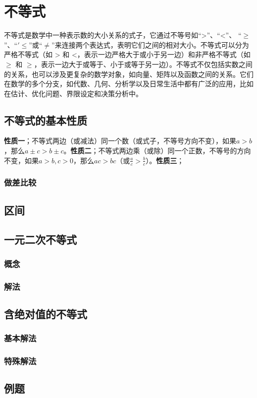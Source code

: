 \section{\textbf{不等式}}

不等式是数学中一种表示数的大小关系的式子，它通过不等号如“>”、“<”、\newline
“$\ge$”、“$'\le$”或“$\ne$”来连接两个表达式，表明它们之间的相对大小。不等式可以分为严格不等式（如 > 和 <，表示一边严格大于或小于另一边）和非严格不等式（如$\ge$ 和 $\ge$，表示一边大于或等于、小于或等于另一边）。不等式不仅包括实数之间的关系，也可以涉及更复杂的数学对象，如向量、矩阵以及函数之间的关系。它们在数学的多个分支，如代数、几何、分析学以及日常生活中都有广泛的应用，比如在估计、优化问题、界限设定和决策分析中。

\subsection{不等式的基本性质}

\textbf{性质一}；不等式两边（或减法）同一个数（或式子，不等号方向不变），如果$a>b$，那么$a\pm c>b\pm c$。\textbf{性质二}；不等式两边乘（或除）同一个正数，不等号的方向不变，如果$a>b,c>0$，那么$ac>bc$（或$\frac{a}{c}>\frac{b}{c}$）。\textbf{性质三}；

\subsubsection{做差比较}

\subsection{区间}

\subsection{一元二次不等式}

\subsubsection{概念}

\subsubsection{解法}

\subsection{含绝对值的不等式}

\subsubsection{基本解法}

\subsubsection{特殊解法}

\subsection{例题}
